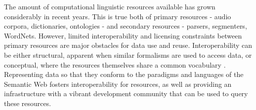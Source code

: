 %
%


The amount of computational linguistic resources available has grown considerably in recent years. 
This is true both of primary resources - audio corpora, dictionaries, ontologies - and secondary resources - parsers, segmenters, WordNets. However, limited interoperability and licensing constraints between primary resources are major obstacles for data use and reuse. Interoperability can be either structural, apparent when similar formalisms are used to access data, or conceptual, where the resources themselves share a common vocabulary \citep{ide-pustejovsky2010-interoperability}. Representing data so that they conform to the paradigms and languages of the Semantic Web fosters interoperability for resources, as well as providing an infrastructure with a vibrant development community that can be used to query these resources. 


